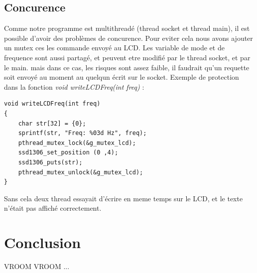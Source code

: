 \documentclass[
	a4paper, %
	10pt, %
]{CSUniSchoolLabReport}
\begin{document}
\subsection{Concurence}
Comme notre programme est multithreadé (thread socket et thread main), il est possible d'avoir des problèmes de concurence. Pour eviter cela nous avons ajouter un mutex ces les commande envoyé au LCD.
Les variable de mode et de frequence sont aussi partagé, et peuvent etre modifié par le thread socket, et par le main. mais dans ce cas, les risques sont assez faible, il faudrait qu'un requette soit envoyé au moment au quelqun écrit sur le socket.
Exemple de protection dans la fonction \textit{void writeLCDFreq(int freq)} : \\
\begin{lstlisting}[style=CStyle]
void writeLCDFreq(int freq)
{
    char str[32] = {0};
    sprintf(str, "Freq: %03d Hz", freq);
    pthread_mutex_lock(&g_mutex_lcd);
    ssd1306_set_position (0 ,4);
    ssd1306_puts(str);
    pthread_mutex_unlock(&g_mutex_lcd);
}
\end{lstlisting}
Sans cela deux thread essayait d'écrire en meme temps sur le LCD, et le texte n'était pas affiché correctement.

\section{Conclusion}

VROOM VROOM ...



\printbibliography %

\end{document}
